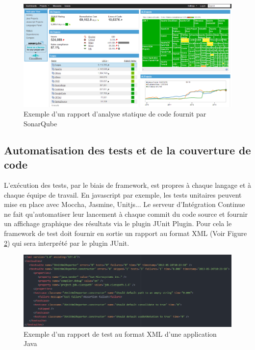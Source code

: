     \begin{figure}
      \begin{center}
        \includegraphics[scale=0.3]{images/SonarQube.png}
      \end{center}
      \caption{Exemple d'un rapport d'analyse statique de code fournit par SonarQube}
      \label{SonarQube}
    \end{figure}

    \subsection{Automatisation des tests et de la couverture de code}
    L'exécution des tests, par le biais de framework, est propres à chaque langage et à chaque équipe de travail. En javascript par exemple, les tests unitaires peuvent mise en place avec Moccha, Jasmine, Unitjs... Le serveur d'Intégration Continue ne fait qu'automatiser leur lancement à chaque commit du code source et fournir un affichage graphique des résultats via le plugin JUnit Plugin. Pour cela le framework de test doit fournir en sortie un rapport au format XML (Voir Figure \ref{ReportXML}) qui sera interprété par le plugin JUnit.

    \begin{figure}
      \begin{center}
        \includegraphics[scale=0.5]{images/ReportXML.png}
      \end{center}
      \caption{Exemple d'un rapport de test au format XML d'une application Java}
      \label{ReportXML}
    \end{figure}

